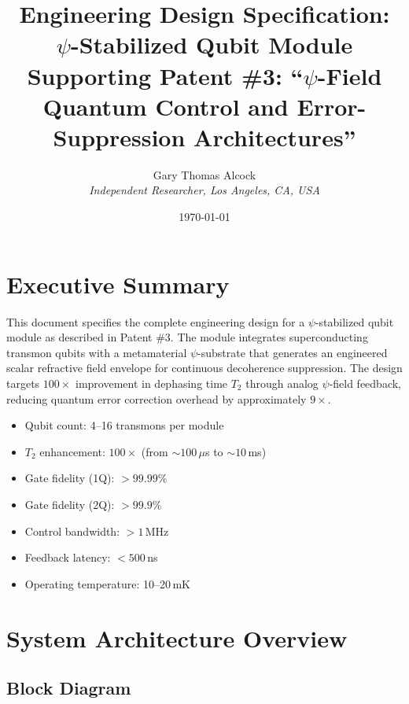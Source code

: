 \documentclass[11pt,letterpaper]{article}
\title{Engineering Design Specification:\\
$\psi$-Stabilized Qubit Module\\[6pt]
\large Supporting Patent \#3: ``$\psi$-Field Quantum Control and
Error-Suppression Architectures''}
\author{Gary Thomas Alcock\\
\textit{Independent Researcher, Los Angeles, CA, USA}}
\date{\today}
\begin{document}
\maketitle
\tableofcontents
\newpage

\section{Executive Summary}

This document specifies the complete engineering design for a
$\psi$-stabilized qubit module as described in Patent \#3. The module
integrates superconducting transmon qubits with a metamaterial
$\psi$-substrate that generates an engineered scalar refractive field
envelope for continuous decoherence suppression. The design targets
$100\times$ improvement in dephasing time $T_2$ through analog
$\psi$-field feedback, reducing quantum error correction overhead by
approximately $9\times$.

\begin{tcolorbox}[colback=blue!5!white, colframe=blue!60!black,
title=Design Targets]
\begin{itemize}[nosep]
\item Qubit count: 4--16 transmons per module
\item $T_2$ enhancement: $100\times$ (from $\sim 100\,\mu$s to
$\sim 10$\,ms)
\item Gate fidelity (1Q): $>99.99\%$
\item Gate fidelity (2Q): $>99.9\%$
\item Control bandwidth: $>1$\,MHz
\item Feedback latency: $<500$\,ns
\item Operating temperature: 10--20\,mK
\end{itemize}
\end{tcolorbox}

\section{System Architecture Overview}

\subsection{Block Diagram}
\end{document}
